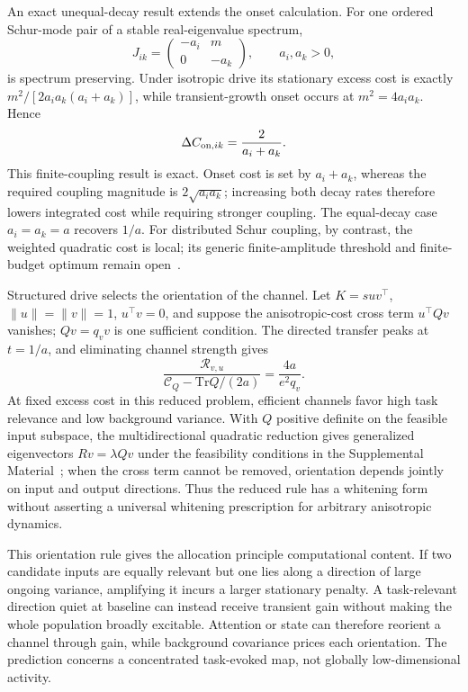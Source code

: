 \documentclass[
  aps,prl,reprint,superscriptaddress,nofootinbib,longbibliography,floatfix,
  amsmath,amssymb
]{revtex4-2}
\newcommand{\Tr}{\mathrm{Tr}}
\newcommand{\Cnoise}{\mathcal C}
\newcommand{\Rtask}{\mathcal R}
\begin{document}
An exact unequal-decay result extends the onset calculation.  For one ordered
Schur-mode pair of a stable real-eigenvalue spectrum,
\begin{equation}
  J_{ik}=\begin{pmatrix}-a_i&m\\0&-a_k\end{pmatrix},
  \qquad a_i,a_k>0,
  \label{eq:pairgenerator}
\end{equation}
is spectrum preserving.  Under isotropic drive its stationary excess cost is
exactly $m^2/[2a_i a_k(a_i+a_k)]$, while transient-growth onset occurs at
$m^2=4a_i a_k$.  Hence
\begin{equation}
  \Delta C_{{\rm on},ik}=\frac{2}{a_i+a_k}.
  \label{eq:paironset}
\end{equation}
This finite-coupling result is exact.  Onset cost is set by $a_i+a_k$, whereas
the required coupling magnitude is $2\sqrt{a_i a_k}$; increasing both decay
rates therefore lowers integrated cost while requiring stronger coupling.  The equal-decay case $a_i=a_k=a$
recovers $1/a$.  For distributed Schur coupling, by contrast, the weighted
quadratic cost is local; its generic finite-amplitude threshold and
finite-budget optimum remain open~\cite{suppl}.

Structured drive selects the orientation of the channel.  Let
$K=suv^\top$, $\|u\|=\|v\|=1$, $u^\top v=0$, and suppose the anisotropic-cost cross term
$u^\top Qv$ vanishes; $Qv=q_vv$ is one sufficient condition.  The directed
transfer peaks at $t=1/a$, and eliminating channel strength gives
\begin{equation}
  \frac{\Rtask_{v,u}}
  {\Cnoise_Q-\Tr Q/(2a)}
  =\frac{4a}{e^2q_v}.
  \label{eq:efficiency}
\end{equation}
At fixed excess cost in this reduced problem, efficient channels favor high
task relevance and low background variance.  With $Q$ positive definite on
the feasible input subspace, the multidirectional quadratic reduction gives
generalized eigenvectors $Rv=\lambda Qv$ under the feasibility
conditions in the Supplemental Material~\cite{suppl}; when the cross term
cannot be removed, orientation depends jointly on input and output directions.
Thus the reduced rule has a whitening form without asserting a universal
whitening prescription for arbitrary anisotropic dynamics.

This orientation rule gives the allocation principle computational content.
If two candidate inputs are equally relevant but one lies along a direction of
large ongoing variance, amplifying it incurs a larger stationary penalty.
A task-relevant direction quiet at baseline can instead receive transient gain
without making the whole population broadly excitable.  Attention or state can
therefore reorient a channel through gain, while background covariance prices
each orientation.  The prediction concerns a concentrated task-evoked map, not
globally low-dimensional activity.
\end{document}
